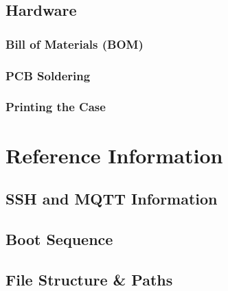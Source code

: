 \documentclass{article}
\begin{document}
\subsection{Hardware}
\subsubsection{Bill of Materials (BOM)}

\subsubsection{PCB Soldering}

\subsubsection{Printing the Case}


\section{Reference Information}
%
\subsection{SSH and MQTT Information}

\subsection{Boot Sequence}

\subsection{File Structure \& Paths}


\end{document}
